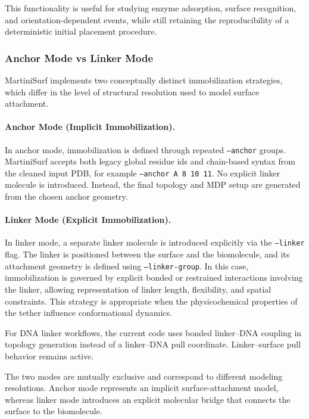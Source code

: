 \documentclass[11pt]{article}
\begin{document}
This functionality is useful for studying enzyme adsorption, surface recognition, and orientation-dependent events, while still retaining the reproducibility of a deterministic initial placement procedure.

\subsubsection*{Anchor Mode vs Linker Mode}

MartiniSurf implements two conceptually distinct immobilization strategies,
which differ in the level of structural resolution used to model surface attachment.

\paragraph{Anchor Mode (Implicit Immobilization).}
In anchor mode, immobilization is defined through repeated
\texttt{--anchor} groups. MartiniSurf accepts both legacy global residue
ids and chain-based syntax from the cleaned input PDB, for example
\texttt{--anchor A 8 10 11}. No explicit linker molecule is introduced.
Instead, the final topology and MDP setup are generated from the chosen
anchor geometry.

\paragraph{Linker Mode (Explicit Immobilization).}
In linker mode, a separate linker molecule is introduced explicitly
via the \texttt{--linker} flag. The linker is positioned between the
surface and the biomolecule, and its attachment geometry is defined
using \texttt{--linker-group}. In this case, immobilization is governed
by explicit bonded or restrained interactions involving the linker,
allowing representation of linker length, flexibility, and spatial
constraints. This strategy is appropriate when the physicochemical
properties of the tether influence conformational dynamics.

For DNA linker workflows, the current code uses bonded linker--DNA
coupling in topology generation instead of a linker--DNA pull
coordinate. Linker--surface pull behavior remains active.

The two modes are mutually exclusive and correspond to different
modeling resolutions. Anchor mode represents an implicit
surface-attachment model, whereas linker mode introduces an explicit
molecular bridge that connects the surface to the biomolecule.
\end{document}
